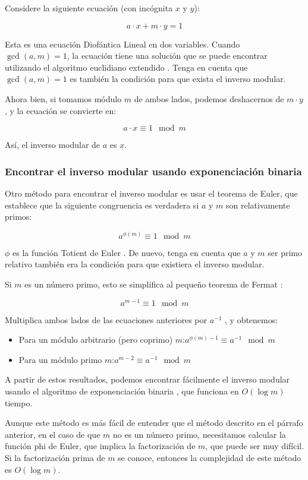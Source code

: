 Considere la siguiente ecuación (con incógnita $x$ y $y$):

$$a \cdot x + m \cdot y = 1$$

Esta es una ecuación Diofántica Lineal en dos variables. Cuando $\gcd(a, m) = 1$, la ecuación tiene una solución que se puede encontrar utilizando el algoritmo euclidiano extendido . Tenga en cuenta que $\gcd(a, m) = 1$ es también la condición para que exista el inverso modular.

Ahora bien, si tomamos módulo $m$ de ambos lados, podemos deshacernos de $m \cdot y$, y la ecuación se convierte en:

$$a \cdot x \equiv 1 \mod m$$

Así, el inverso modular de $a$ es $x$.

\subsubsection{Encontrar el inverso modular usando exponenciación binaria}

Otro método para encontrar el inverso modular es usar el teorema de Euler, que establece que la siguiente congruencia es verdadera si $a$ y $m$ son relativamente primos:

$$a^{\phi (m)} \equiv 1 \mod m$$

$\phi$ es la función Totient de Euler . De nuevo, tenga en cuenta que $a$ y $m$ ser primo relativo también era la condición para que existiera el inverso modular.

Si $m$ es un número primo, esto se simplifica al pequeño teorema de Fermat :

$$a^{m - 1} \equiv 1 \mod m$$

Multiplica ambos lados de las ecuaciones anteriores por $a^{-1}$ , y obtenemos:

\begin{itemize}
	\item Para un módulo arbitrario (pero coprimo) $m$:$a^{\phi(m)-1}\equiv a ^{-1}\mod m$
	\item Para un módulo primo $m$:$a^{m-2} \equiv a^{-1}\mod m$
\end{itemize}

A partir de estos resultados, podemos encontrar fácilmente el inverso modular usando el algoritmo de exponenciación binaria , que funciona en $O(\log m)$ tiempo.

Aunque este método es más fácil de entender que el método descrito en el párrafo anterior, en el caso de que $m$ no es un número primo, necesitamos calcular la función phi de Euler, que implica la factorización de $m$, que puede ser muy difícil. Si la factorización prima de $m$ se conoce, entonces la complejidad de este método es $O(\log m)$.

